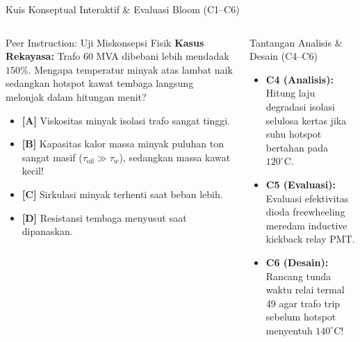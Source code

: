\documentclass[aspectratio=169,10pt]{beamer}
\begin{document}
\begin{frame}{Kuis Konseptual Interaktif \& Evaluasi Bloom (C1--C6)}
  \begin{columns}[t]
    \begin{alertblock}{Peer Instruction: Uji Miskonsepsi Fisik}
      \footnotesize
      \textbf{Kasus Rekayasa:} Trafo 60 MVA dibebani lebih mendadak $150\%$. Mengapa temperatur minyak atas lambat naik sedangkan hotspot kawat tembaga langsung melonjak dalam hitungan menit?
      \vspace{0.05cm}
      \begin{itemize}\setlength{\itemsep}{1pt}
        \item \textbf{[A]} Viskositas minyak isolasi trafo sangat tinggi.
        \item \textbf{[B]} Kapasitas kalor massa minyak puluhan ton sangat masif ($\tau_{\text{oil}} \gg \tau_w$), sedangkan massa kawat kecil!
        \item \textbf{[C]} Sirkulasi minyak terhenti saat beban lebih.
        \item \textbf{[D]} Resistansi tembaga menyusut saat dipanaskan.
      \end{itemize}
    \end{alertblock}

    \begin{block}{Tantangan Analisis \& Desain (C4--C6)}
      \footnotesize
      \begin{itemize}\setlength{\itemsep}{2pt}
        \item \textbf{C4 (Analisis):} Hitung laju degradasi isolasi selulosa kertas jika suhu hotspot bertahan pada $120^\circ\text{C}$.
        \item \textbf{C5 (Evaluasi):} Evaluasi efektivitas dioda freewheeling meredam inductive kickback relay PMT.
        \item \textbf{C6 (Desain):} Rancang tunda waktu relai termal 49 agar trafo trip sebelum hotspot menyentuh $140^\circ\text{C}$!
      \end{itemize}
    \end{block}
  \end{columns}
\end{frame}
\end{document}

